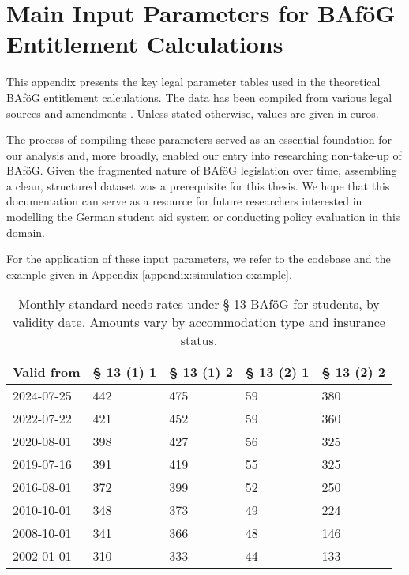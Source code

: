 \newpage
\section{Main Input Parameters for BAföG Entitlement Calculations} \label{appendix:input_params}

This appendix presents the key legal parameter tables used in the theoretical BAföG entitlement calculations. 
The data has been compiled from various legal sources and amendments \cite{bafoeg_law, bafoeg20, bafoeg21, bafoeg22, bafoeg23, bafoeg24, bafoeg25, bafoeg26, bafoeg27, bafoeg28, bafoeg29}. 
Unless stated otherwise, values are given in euros.

The process of compiling these parameters served as an essential foundation for our analysis and, more broadly, enabled our entry into researching non-take-up of BAföG. 
Given the fragmented nature of BAföG legislation over time, assembling a clean, structured dataset was a prerequisite for this thesis.
We hope that this documentation can serve as a resource for future researchers interested in modelling the German student aid system or conducting policy evaluation in this domain.

For the application of these input parameters, we refer to the codebase \citep[][version~\texttt{v1.0}]{bystrom2025msc} and the example given in Appendix \ref{appendix:simulation-example}.
\vspace{1em}

\begin{table}[H]
\centering
\small
\begin{tabularx}{\textwidth}{lXXXX}
\toprule
\textbf{Valid from} & \textbf{§ 13 (1) 1} & \textbf{§ 13 (1) 2} & \textbf{§ 13 (2) 1} & \textbf{§ 13 (2) 2} \\
\midrule
2024-07-25 & 442 & 475 & 59 & 380 \\
2022-07-22 & 421 & 452 & 59 & 360 \\
2020-08-01 & 398 & 427 & 56 & 325 \\
2019-07-16 & 391 & 419 & 55 & 325 \\
2016-08-01 & 372 & 399 & 52 & 250 \\
2010-10-01 & 348 & 373 & 49 & 224 \\
2008-10-01 & 341 & 366 & 48 & 146 \\
2002-01-01 & 310 & 333 & 44 & 133 \\
\bottomrule
\end{tabularx}
\caption{Monthly standard needs rates under § 13 BAföG for students, by validity date. Amounts vary by accommodation type and insurance status.}
\end{table}

